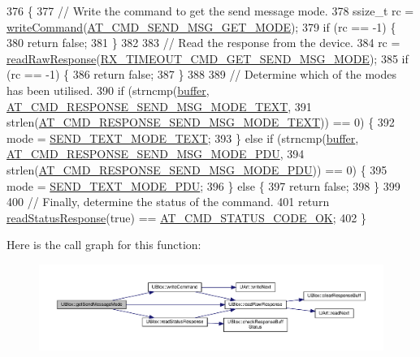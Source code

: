 \begin{DoxyCode}
376 \{
377     \textcolor{comment}{// Write the command to get the send message mode.}
378     ssize\_t rc = \hyperlink{class_u_blox_af604d1897a66192bf1c2a11997f2634d}{writeCommand}(\hyperlink{_u_blox_8cpp_a93c42ef646fa4bf7dcef597278717e1d}{AT\_CMD\_SEND\_MSG\_GET\_MODE});
379     \textcolor{keywordflow}{if} (rc == -1) \{
380         \textcolor{keywordflow}{return} \textcolor{keyword}{false};
381     \}
382 
383     \textcolor{comment}{// Read the response from the device.}
384     rc = \hyperlink{class_u_blox_ab4a7ab4b8922d91e23f273ae160c1bed}{readRawResponse}(\hyperlink{_u_blox_8cpp_a0d3650f2c57519450b5d94f5783dd9e8}{RX\_TIMEOUT\_CMD\_GET\_SEND\_MSG\_MODE});
385     \textcolor{keywordflow}{if} (rc == -1) \{
386         \textcolor{keywordflow}{return} \textcolor{keyword}{false};
387     \}
388 
389     \textcolor{comment}{// Determine which of the modes has been utilised.}
390     \textcolor{keywordflow}{if} (strncmp(\hyperlink{class_u_blox_a6ca4b90f3dc4e856181dce1ebda6f82c}{buffer}, \hyperlink{_u_blox_8cpp_abcee20eed819eab289d6b0d8b0af185d}{AT\_CMD\_RESPONSE\_SEND\_MSG\_MODE\_TEXT},
391                 strlen(\hyperlink{_u_blox_8cpp_abcee20eed819eab289d6b0d8b0af185d}{AT\_CMD\_RESPONSE\_SEND\_MSG\_MODE\_TEXT})) == 0) \{
392         mode = \hyperlink{_u_blox_8h_a4fdc1adf2ea333d6490119160a35401a}{SEND\_TEXT\_MODE\_TEXT};
393     \} \textcolor{keywordflow}{else} \textcolor{keywordflow}{if} (strncmp(\hyperlink{class_u_blox_a6ca4b90f3dc4e856181dce1ebda6f82c}{buffer}, \hyperlink{_u_blox_8cpp_a6af49f58e2fffa15f34ee986afc28ef1}{AT\_CMD\_RESPONSE\_SEND\_MSG\_MODE\_PDU},
394                        strlen(\hyperlink{_u_blox_8cpp_a6af49f58e2fffa15f34ee986afc28ef1}{AT\_CMD\_RESPONSE\_SEND\_MSG\_MODE\_PDU})) == 0) \{
395         mode = \hyperlink{_u_blox_8h_a710349e6aa9dc432a71590c80ce184b1}{SEND\_TEXT\_MODE\_PDU};
396     \} \textcolor{keywordflow}{else} \{
397         \textcolor{keywordflow}{return} \textcolor{keyword}{false};
398     \}
399 
400     \textcolor{comment}{// Finally, determine the status of the command.}
401     \textcolor{keywordflow}{return} \hyperlink{class_u_blox_a4eaca5b1b1c4b5b6f6164b220dd43e0b}{readStatusResponse}(\textcolor{keyword}{true}) == \hyperlink{_u_blox_8cpp_a6ebc1682eb6b9964fccb4a61688ff307}{AT\_CMD\_STATUS\_CODE\_OK};
402 \}
\end{DoxyCode}
Here is the call graph for this function\+:\nopagebreak
\begin{figure}[H]
\begin{center}
\leavevmode
\includegraphics[width=350pt]{da/df6/class_u_blox_aee30d82dcf52335d19f77e766db78ab4_cgraph}
\end{center}
\end{figure}
